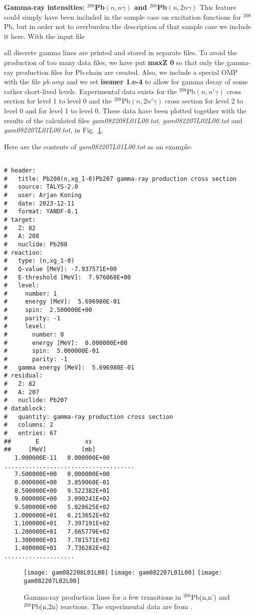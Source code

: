 \begin{samplecase}
{\bf Gamma-ray intensities: ${}^{208}$Pb$(n,n\gamma )$ and ${}^{208}$Pb$(n,2n\gamma )$}\newline
This feature could simply have been included in the sample case on 
excitation functions for ${}^{208}$Pb, but in order not to overburden the
description of that sample case we include it here. With the input file


all discrete gamma lines are printed and stored in separate files.
To avoid the production of too many data files, we have put {\bf maxZ 0} so 
that only the gamma-ray production files for Pb-chain are created. Also, we 
include a special OMP with
the file {\em pb.omp} and we set {\bf isomer 1.e-4} to allow for gamma decay
of some rather short-lived levels.
Experimental data exists for 
the ${}^{208}$Pb$(n,n'\gamma)$ cross section for level 1 to level 0 and
the ${}^{208}$Pb$(n,2n'\gamma)$ cross section for level 2 to level 0 and for 
level 1 to level 0. These
data have been plotted together with the results of the calculated files
{\em gam082208L01L00.tot}, {\em gam082207L02L00.tot} and 
{\em gam082207L01L00.tot}, in Fig.~\ref{pbgamma}.

Here are the contents of {\em gam082207L01L00.tot} as an example:
{\small \begin{verbatim}

# header:
#   title: Pb208(n,xg_1-0)Pb207 gamma-ray production cross section
#   source: TALYS-2.0
#   user: Arjan Koning
#   date: 2023-12-11
#   format: YANDF-0.1
# target:
#   Z: 82
#   A: 208
#   nuclide: Pb208
# reaction:
#   type: (n,xg_1-0)
#   Q-value [MeV]: -7.937571E+00
#   E-threshold [MeV]:  7.976068E+00
#   level:
#     number: 1
#     energy [MeV]:  5.696980E-01
#     spin:  2.500000E+00
#     parity: -1
#     level:
#       number: 0
#       energy [MeV]:  0.000000E+00
#       spin:  5.000000E-01
#       parity: -1
#   gamma energy [MeV]:  5.696980E-01
# residual:
#   Z: 82
#   A: 207
#   nuclide: Pb207
# datablock:
#   quantity: gamma-ray production cross section
#   columns: 2
#   entries: 67
##       E             xs
##     [MeV]          [mb]
   1.000000E-11   0.000000E+00
.....................................
   7.500000E+00   0.000000E+00
   8.000000E+00   3.859060E-01
   8.500000E+00   9.522382E+01
   9.000000E+00   3.090241E+02
   9.500000E+00   5.028625E+02
   1.000000E+01   6.213652E+02
   1.100000E+01   7.397191E+02
   1.200000E+01   7.665779E+02
   1.300000E+01   7.781571E+02
   1.400000E+01   7.736282E+02
....................
\end{verbatim} } \renewcommand{\baselinestretch}{1.07}\small\normalsize
\noindent
\end{samplecase}
\begin{figure}
\centering\texttt{[image: gam082208L01L00]}
\centering\texttt{[image: gam082207L01L00]}
\centering\texttt{[image: gam082207L02L00]}
\caption{Gamma-ray production lines for a few transitions in ${}^{208}$Pb(n,n')
and ${}^{208}$Pb(n,2n) reactions.
The experimental data are from \protect\cite{Vonach1994}.}
\label{pbgamma}
\end{figure}

